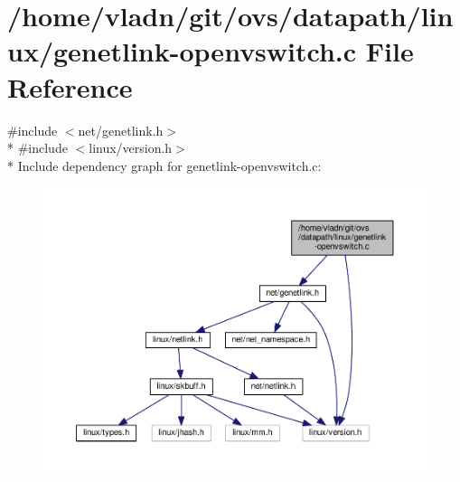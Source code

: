 \hypertarget{genetlink-openvswitch_8c}{}\section{/home/vladn/git/ovs/datapath/linux/genetlink-\/openvswitch.c File Reference}
\label{genetlink-openvswitch_8c}
{\ttfamily \#include $<$net/genetlink.\+h$>$}\\*
{\ttfamily \#include $<$linux/version.\+h$>$}\\*
Include dependency graph for genetlink-\/openvswitch.c\+:
\nopagebreak
\begin{figure}[H]
\begin{center}
\leavevmode
\includegraphics[width=350pt]{genetlink-openvswitch_8c__incl}
\end{center}
\end{figure}
